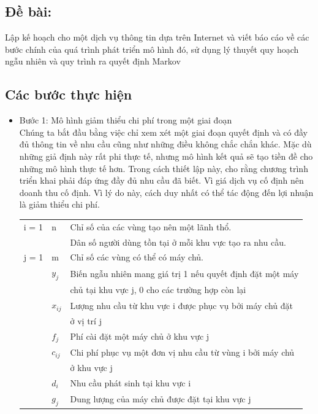 \documentclass[a4paper]{article}
\begin{document}
    \subsection{Đề bài:}

    Lập kế hoạch cho một dịch vụ thông tin dựa trên Internet và viết báo cáo về các bước chính của quá trình phát triển mô hình đó, 
    sử dụng lý thuyết quy hoạch ngẫu nhiên và quy trình ra quyết định Markov

    \subsection{Các bước thực hiện}
    \begin{itemize}
        \item Bước 1: Mô hình giảm thiểu chi phí trong một giai đoạn\\
        Chúng ta bắt đầu bằng việc chỉ xem xét một giai đoạn quyết định và có đầy đủ thông tin về nhu cầu cũng như những điều không chắc chắn khác. 
        Mặc dù những giả định này rất phi thực tế, nhưng mô hình kết quả sẽ tạo tiền đề cho những mô hình thực tế hơn. 
        Trong cách thiết lập này, cho rằng chương trình triển khai phải đáp ứng đầy đủ nhu cầu đã biết. 
        Vì giá dịch vụ cố định nên doanh thu cố định. Vì lý do này, cách duy nhất có thể tác động đến lợi nhuận là giảm thiểu chi phí.
        
        \begin{tabular}{lll}
            \toprule
            i = 1 & n & Chỉ số của các vùng tạo nên một lãnh thổ.\\
            &&Dân số người dùng tồn tại ở mỗi khu vực tạo ra nhu cầu.\\
            \midrule
            j = 1 & m & Chỉ số các vùng có thể có máy chủ.\\
            &$y_j$ & Biến ngẫu nhiên mang giá trị 1 nếu quyết định đặt một máy\\
            &&chủ tại khu vực j, 0 cho các trường hợp còn lại\\
            &$x_{ij}$ & Lượng nhu cầu từ khu vực i được phục vụ bởi máy chủ đặt\\
            &&ở vị trí j\\
            & $f_j$ & Phí cài đặt một máy chủ ở khu vực j\\
            & $c_{ij}$ & Chi phí phục vụ một đơn vị nhu cầu từ vùng i bởi máy chủ\\
            &&ở khu vực j\\
            & $d_i$ & Nhu cầu phát sinh tại khu vực i\\
            & $g_j$ & Dung lượng của máy chủ được đặt tại khu vực j\\
            \bottomrule
        \end{tabular}


\end{itemize}
\end{document}
